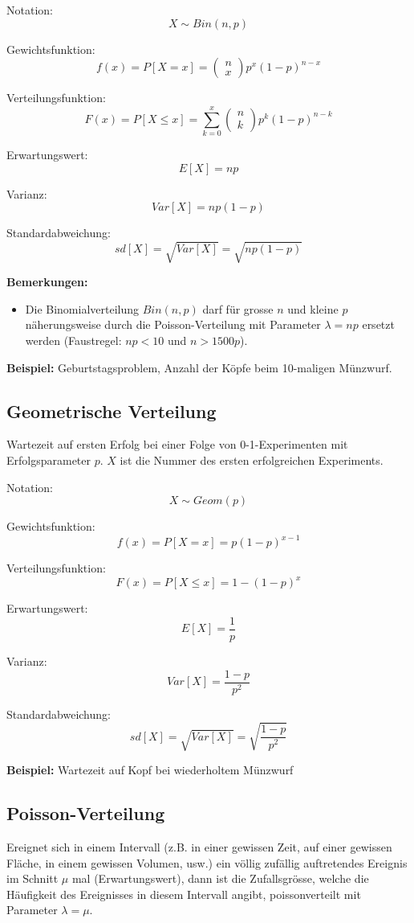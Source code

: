 \documentclass[10pt,a4paper,twocolumn]{article}
\begin{document}
Notation:
\[
X \sim Bin(n,p)
\]

Gewichtsfunktion:
\[
f(x)=P[X=x]=
\left(
	\begin{array}{c}
		n \\
		x
	\end{array}
\right)
p^x(1-p)^{n-x}
\]

Verteilungsfunktion:
\[
F(x)=P[X \leq x]=\sum \limits_{k=0}^x 
\left(
	\begin{array}{c}
		n \\
		k
	\end{array}
\right)
p^k(1-p)^{n-k}
\]

Erwartungswert:
\[
E[X]=np
\]

Varianz:
\[
Var[X]=np(1-p)
\]

Standardabweichung:
\[
sd[X]=\sqrt{Var[X]}=\sqrt{np(1-p)}
\]

\textbf{Bemerkungen:}
\begin{itemize}
\item Die Binomialverteilung $Bin(n,p)$ darf für grosse $n$ und kleine $p$ näherungsweise durch die Poisson-Verteilung mit Parameter $\lambda = np$ ersetzt werden (Faustregel: $np<10$ und $n>1500p$).
\end{itemize}

\textbf{Beispiel:} Geburtstagsproblem, Anzahl der Köpfe beim 10-maligen Münzwurf.

\subsection{Geometrische Verteilung}
Wartezeit auf ersten Erfolg bei einer Folge von 0-1-Experimenten mit Erfolgsparameter $p$. $X$ ist die Nummer des ersten erfolgreichen Experiments.

\vspace{10pt}

Notation:
\[
X \sim Geom(p)
\]

Gewichtsfunktion:
\[
f(x)=P[X=x]=p(1-p)^{x-1}
\]

Verteilungsfunktion:
\[
F(x)=P[X \leq x]=1-(1-p)^{x}
\]

Erwartungswert:
\[
E[X]=\frac{1}{p}
\]

Varianz:
\[
Var[X]=\frac{1-p}{p^2}
\]

Standardabweichung:
\[
sd[X]=\sqrt{Var[X]}=\sqrt{\frac{1-p}{p^2}}
\]

\textbf{Beispiel:} Wartezeit auf Kopf bei wiederholtem Münzwurf

\subsection{Poisson-Verteilung}
Ereignet sich in einem Intervall (z.B. in einer gewissen Zeit, auf einer gewissen Fläche, in einem gewissen Volumen, usw.) ein völlig zufällig auftretendes Ereignis im Schnitt $\mu$ mal (Erwartungswert), dann ist die Zufallsgrösse, welche die Häufigkeit des Ereignisses in diesem Intervall angibt, poissonverteilt mit Parameter $\lambda=\mu$.
\end{document}
